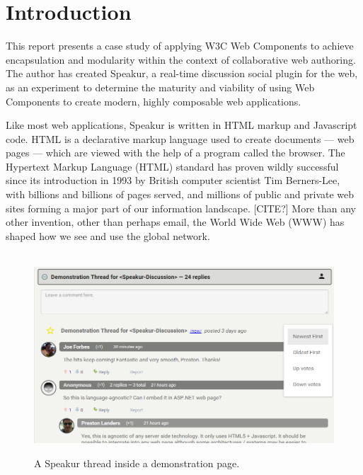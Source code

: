 \chapter{Introduction}
%

%
%

This report presents a case study of applying W3C Web Components 
to achieve encapsulation and modularity within the context of collaborative web authoring. 
The author has created Speakur, a real-time discussion social plugin for the web, 
as an experiment to determine the maturity and viability of using Web Components to create modern, highly composable web applications.

Like most web applications, Speakur is written in HTML markup and Java\-script code. 
HTML is a declarative markup language used to create documents --- web pages --- which are viewed with the help of a program called the browser. 
The Hyper\-text Markup Language (HTML) 
standard has proven wildly successful since its introduction in 1993 by British computer scientist 
Tim Berners-Lee, 
with billions and billions of pages served, 
and millions of public and private web sites forming a major part of our information landscape. [CITE?]
More than any other invention, other than perhaps email, the World Wide Web (WWW) has shaped how we see and use the global network.

% 
\begin{figure}[htb]
\begin{center}
\ \includegraphics[width=6in]{images/screenshot_20150312_1630_v2.png}
\caption{A Speakur thread inside a demonstration page.}
\label{f:ex}
\end{center}
\end{figure}
%

